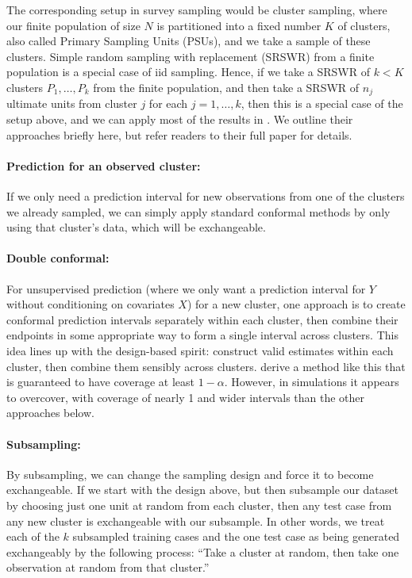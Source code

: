 \documentclass[10.5pt, letterpaper]{article}
\numberwithin{table}{section}
\numberwithin{figure}{section}
\numberwithin{equation}{section}
\begin{document}
The corresponding setup in survey sampling would be cluster sampling, where our finite population of size $N$ is partitioned into a fixed number $K$ of clusters, also called Primary Sampling Units (PSUs), and we take a sample of these clusters. Simple random sampling with replacement (SRSWR) from a finite population is a special case of iid sampling. Hence, if we take a SRSWR of $k<K$ clusters $P_1,\ldots,P_k$ from the finite population, and then take a SRSWR of $n_j$ ultimate units from cluster $j$ for each $j=1,\ldots,k$, then this is a special case of the setup above, and we can apply most of the results in \cite{dunn2022distribution}. We outline their approaches briefly here, but refer readers to their full paper for details.

\paragraph{Prediction for an observed cluster:} If we only need a prediction interval for new observations from one of the clusters we already sampled, we can simply apply standard conformal methods by only using that cluster's data, which will be exchangeable.

\paragraph{Double conformal:} For unsupervised prediction (where we only want a prediction interval for $Y$ without conditioning on covariates $X$) for a new cluster, one approach is to create conformal prediction intervals separately within each cluster, then combine their endpoints in some appropriate way to form a single interval across clusters. This idea lines up with the design-based spirit: construct valid estimates within each cluster, then combine them sensibly across clusters. \cite{dunn2022distribution} derive a method like this that is guaranteed to have coverage at least $1-\alpha$. However, in simulations it appears to overcover, with coverage of nearly 1 and wider intervals than the other approaches below.

\paragraph{Subsampling:} By subsampling, we can change the sampling design and force it to become exchangeable. If we start with the design above, but then subsample our dataset by choosing just one unit at random from each cluster, then any test case from any new cluster is exchangeable with our subsample. In other words, we treat each of the $k$ subsampled training cases and the one test case as being generated exchangeably by the following process: ``Take a cluster at random, then take one observation at random from that cluster.''
\end{document}
